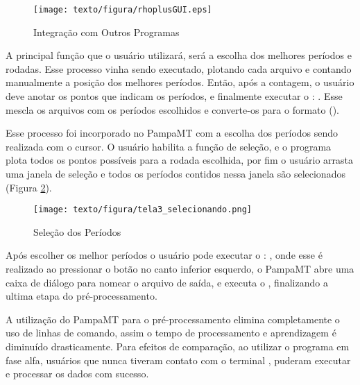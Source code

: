     \begin{figure}[H]
        \caption{Integração com Outros Programas}
            \begin{center}
                \texttt{[image: texto/figura/rhoplusGUI.eps]}
            \end{center}
        \label{rhoplusGUI}
    \end{figure}
    
    A principal função que o usuário utilizará, será a escolha dos melhores períodos e rodadas. Esse processo vinha sendo executado, plotando cada arquivo  e contando manualmente a posição dos melhores períodos. Então, após a contagem, o usuário deve anotar os pontos que indicam os períodos, e finalmente executar o : . Esse  mescla os arquivos  com os períodos escolhidos e converte-os para o formato  ().
    
    Esse processo foi incorporado no PampaMT com a escolha dos períodos sendo realizada com o cursor. O usuário habilita a função de seleção, e o programa plota todos os pontos possíveis para a rodada escolhida, por fim o usuário arrasta uma janela de seleção e todos os períodos contidos nessa janela são selecionados (Figura \ref{selc-perio}).
    
    \begin{landscape}
    \begin{figure}[h]
        \caption{Seleção dos Períodos}
            \begin{center}
                \texttt{[image: texto/figura/tela3\_selecionando.png]}
            \end{center}
        \label{selc-perio}
    \end{figure}
    \end{landscape}
    
    Após escolher os melhor períodos o usuário pode executar o : , onde esse é realizado ao pressionar o botão no canto inferior esquerdo, o PampaMT abre uma caixa de diálogo para nomear o arquivo de saída, e executa o , finalizando a ultima etapa do pré-processamento.
    
    A utilização do PampaMT para o pré-processamento elimina completamente o uso de linhas de comando, assim o tempo de processamento e aprendizagem é diminuído drasticamente. Para efeitos de comparação, ao utilizar o programa em fase alfa, usuários que nunca tiveram contato com o terminal \Shell, puderam executar e processar os dados com sucesso.
    
